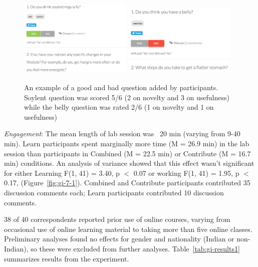 \begin{figure}[h] 
  \centering
  \includegraphics[width=0.48\textwidth]{figures/gutinstinct/gi-8a.png}
  \includegraphics[width=0.48\textwidth]{figures/gutinstinct/gi-8b.png}
  \caption[Examples of questions added by participants]
{An example of a good and bad question added by participants. Soylent question was scored 5/6 (2 on novelty and 3 on usefulness) while the belly question was rated 2/6 (1 on novelty and 1 on usefulness) }
  \label{fig:gi-8}
\end{figure}

\textit{Engagement}: The mean length of lab session was ~20 min (varying from 9-40 min). Learn participants spent marginally more time (M = 26.9 min) in the lab session than participants in Combined (M = 22.5 min) or Contribute (M = 16.7 min) conditions. An analysis of variance showed that this effect wasn’t significant for either Learning F(1, 41) = 3.40, p $<$ 0.07 or working F(1, 41) = 1.95, p $<$ 0.17, (Figure~\ref{fig:gi-7-1}). Combined and Contribute participants contributed 35 discussion comments each; Learn participants contributed 10 discussion comments.

38 of 40 correspondents reported prior use of online courses, varying from occasional use of online learning material to taking more than five online classes. Preliminary analyses found no effects for gender and nationality (Indian or non-Indian), so these were excluded from further analyses. Table~\ref{tab:gi-results1} summarizes results from the experiment. 

